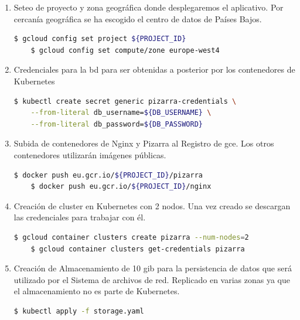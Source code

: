 \documentclass[11pt,spanish,listoffigures,listoftables]{tfgetsinf}
\begin{document}
\begin{enumerate}
	
	\item Seteo de proyecto y zona geográfica donde desplegaremos el aplicativo. Por cercanía geográfica se ha escogido el centro de datos de Países Bajos.
	
	\begin{lstlisting}[language=bash]
	$ gcloud config set project ${PROJECT_ID}
	$ gcloud config set compute/zone europe-west4
	\end{lstlisting}
	
	\item Credenciales para la \acrshort{bd} para ser obtenidas a posterior por los contenedores de Kubernetes
	
	\begin{lstlisting}[language=bash]
	$ kubectl create secret generic pizarra-credentials \
	--from-literal db_username=${DB_USERNAME} \
	--from-literal db_password=${DB_PASSWORD}
	\end{lstlisting}
	
	\item Subida de \Gls{contenedor}es de Nginx y Pizarra al Registro de \acrshort{gce}. Los otros \Gls{contenedor}es utilizarán imágenes públicas.
	
	\begin{lstlisting}[language=bash]	
	$ docker push eu.gcr.io/${PROJECT_ID}/pizarra
	$ docker push eu.gcr.io/${PROJECT_ID}/nginx
	\end{lstlisting}
	
	
	\item Creación de cluster en Kubernetes con 2 nodos. Una vez creado se descargan las credenciales para trabajar con él.

	\begin{lstlisting}[language=bash]	
	$ gcloud container clusters create pizarra --num-nodes=2
	$ gcloud container clusters get-credentials pizarra
	\end{lstlisting}

	\item Creación de Almacenamiento de 10 \acrshort{gib} para la persistencia de datos que será utilizado por el Sistema de archivos de red. Replicado en varias zonas ya que el almacenamiento no es parte de Kubernetes.
	
	\begin{lstlisting}[language=bash]	
	$ kubectl apply -f storage.yaml
	\end{lstlisting}
	

\end{enumerate}
\end{document}
